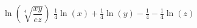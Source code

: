 {$\ln\left(\sqrt[4]{\dfrac{xy}{ez}}\right)$}
{$\frac{1}{4} \ln(x) + \frac{1}{4} \ln(y) - \frac{1}{4} - \frac{1}{4} \ln(z)$}

